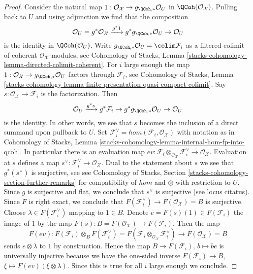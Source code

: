 \begin{proof}
Consider the natural map
$1 : \mathcal{O}_\mathcal{X} \to g_{\QCoh, *}\mathcal{O}_U$
in $\QCoh(\mathcal{O}_\mathcal{X})$. Pulling back to $U$ and
using adjunction we find that the composition
$$
\mathcal{O}_U =
g^*\mathcal{O}_\mathcal{X} \xrightarrow{g^*1}
g^*g_{\QCoh, *}\mathcal{O}_U \to \mathcal{O}_U
$$
is the identity in $\QCoh(\mathcal{O}_U)$.
Write $g_{\QCoh, *}\mathcal{O}_U = \colim \mathcal{F}_i$
as a filtered colimit of coherent $\mathcal{O}_\mathcal{X}$-modules, see
Cohomology of Stacks, Lemma
\ref{stacks-cohomology-lemma-directed-colimit-coherent}.
For $i$ large enough the map
$1 : \mathcal{O}_\mathcal{X} \to g_{\QCoh, *}\mathcal{O}_U$
factors through $\mathcal{F}_i$, see
Cohomology of Stacks, Lemma
\ref{stacks-cohomology-lemma-finite-presentation-quasi-compact-colimit}.
Say $s : \mathcal{O}_\mathcal{X} \to \mathcal{F}_i$ is the
factorization. Then
$$
\mathcal{O}_U \xrightarrow{g^*s} g^*\mathcal{F}_i \to
g^*g_{\QCoh, *}\mathcal{O}_U \to \mathcal{O}_U
$$
is the identity. In other words, we see that $s$ becomes the
inclusion of a direct summand upon pullback to $U$. Set
$\mathcal{F}_i^\vee = hom(\mathcal{F}_i, \mathcal{O}_\mathcal{X})$
with notation as in
Cohomology of Stacks, Lemma
\ref{stacks-cohomology-lemma-internal-hom-fp-into-qcoh}.
In particular there is an evaluation map
$ev : \mathcal{F}_i \otimes_{\mathcal{O}_\mathcal{X}} \mathcal{F}_i^\vee
\to \mathcal{O}_\mathcal{X}$.
Evaluation at $s$ defines a map
$s^\vee : \mathcal{F}_i^\vee \to \mathcal{O}_\mathcal{X}$.
Dual to the statement about $s$ we see that $g^*(s^\vee)$ is surjective, see
see Cohomology of Stacks, Section
\ref{stacks-cohomology-section-further-remarks}
for compatibility of $hom$ and $\otimes$ with restriction to $U$.
Since $g$ is surjective and flat, we conclude that $s^\vee$ is surjective
(see locus citatus). Since $F$ is right exact, we conclude that
$F(\mathcal{F}_i^\vee) \to F(\mathcal{O}_\mathcal{X}) = B$ is surjective.
Choose $\lambda \in F(\mathcal{F}_i^\vee)$
mapping to $1 \in B$. Denote $e = F(s)(1) \in F(\mathcal{F}_i)$
the image of $1$ by the map
$F(s) : B = F(\mathcal{O}_\mathcal{X}) \to F(\mathcal{F}_i)$.
Then the map
$$
F(ev) :
F(\mathcal{F}_i) \otimes_B F(\mathcal{F}_i^\vee) =
F(\mathcal{F}_i \otimes_{\mathcal{O}_\mathcal{X}} \mathcal{F}_i^\vee)
\longrightarrow
F(\mathcal{O}_\mathcal{X}) = B
$$
sends $e \otimes \lambda$ to $1$ by construction. Hence the
map $B \to F(\mathcal{F}_i)$, $b \mapsto be$
is universally injective because we have the one-sided
inverse $F(\mathcal{F}_i) \to B$, $\xi \mapsto F(ev)(\xi \otimes \lambda)$.
Since this is true for all $i$ large enough we conclude.
\end{proof}


